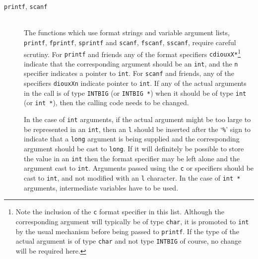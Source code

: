 \documentclass[twoside,11pt]{article}
\renewcommand{\_}{\texttt{\symbol{95}}}
\newcommand{\cc}[1]{{\tt #1}}
\newcommand{\ditem}[1]{\item[#1]\mbox{}\\}
\begin{document}
\begin{description}
\begin{description}
%
\ditem{\cc{printf}, \cc{scanf}}
The functions which use format strings and variable argument lists,
\cc{printf}, \cc{fprintf}, \cc{sprintf} and 
\cc{scanf}, \cc{fscanf}, \cc{sscanf},
require careful scrutiny.
For \cc{printf} and friends 
any of the format specifiers \cc{cdiouxX*}\footnote{
   Note the inclusion of the \cc{c} format specifier in this list.
   Although the corresponding argument will typically be of type \cc{char},
   it is promoted to \cc{int} by the usual mechanism before being 
   passed to \cc{printf}.  If the type of the actual argument is
   of type \cc{char} and not type \cc{INT\_BIG} of course, no change 
   will be required here.
}
indicate that the corresponding argument should be an \cc{int},
and the \cc{n} specifier indicates a pointer to \cc{int}.
For \cc{scanf} and friends, any of the specifiers \cc{diouxXn} indicate
pointer to \cc{int}.
If any of the actual arguments in the call is of type \cc{INT\_BIG} 
(or \cc{INT\_BIG~*}) when it should be of type \cc{int} (or \cc{int~*}),
then the calling code needs to be changed.

In the case of \cc{int} arguments, if the actual argument
might be too large to be
represented in an \cc{int}, then an \cc{l} should be inserted 
after the `{\tt\%}' sign to 
indicate that a \cc{long} argument is being supplied and the 
corresponding argument should be cast to \cc{long}.  If it will definitely
be possible to store the value in an \cc{int} then the format specifier
may be left alone and the argument cast to \cc{int}.
Arguments passed using the \cc{c} or \cc{*} specifiers should be cast 
to \cc{int}, and not modified with an \cc{l} character.
In the case of \cc{int~*} arguments, intermediate variables have to be used.


\end{description}
\end{description}
\end{document}
